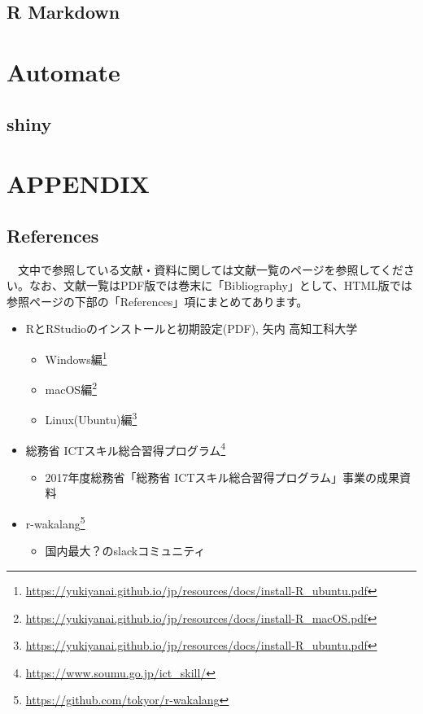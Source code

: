 \documentclass[
  12pt,
]{book}
\DeclareRobustCommand{\href}[2]{#2\footnote{\url{#1}}}
\providecommand{\tightlist}{%
  \setlength{\itemsep}{0pt}\setlength{\parskip}{0pt}}
\begin{document}
\hypertarget{r-markdown}{%
\chapter{R Markdown}\label{r-markdown}}

\hypertarget{part-automate}{%
\part{Automate}\label{part-automate}}

\hypertarget{shiny}{%
\chapter{shiny}\label{shiny}}

\hypertarget{part-appendix}{%
\part{APPENDIX}\label{part-appendix}}

\hypertarget{appendix-appendix}{%
\appendix {}}


\hypertarget{references}{%
\chapter{References}\label{references}}

　文中で参照している文献・資料に関しては文献一覧のページを参照してください。なお、文献一覧はPDF版では巻末に「Bibliography」として、HTML版では参照ページの下部の「References」項にまとめてあります。

\begin{itemize}
\tightlist
\item
  RとRStudioのインストールと初期設定(PDF), 矢内 高知工科大学

  \begin{itemize}
  \tightlist
  \item
    \href{https://yukiyanai.github.io/jp/resources/docs/install-R_ubuntu.pdf}{Windows編}
  \item
    \href{https://yukiyanai.github.io/jp/resources/docs/install-R_macOS.pdf}{macOS編}
  \item
    \href{https://yukiyanai.github.io/jp/resources/docs/install-R_ubuntu.pdf}{Linux(Ubuntu)編}
  \end{itemize}
\item
  \href{https://www.soumu.go.jp/ict_skill/}{総務省 ICTスキル総合習得プログラム}

  \begin{itemize}
  \tightlist
  \item
    2017年度総務省「総務省 ICTスキル総合習得プログラム」事業の成果資料
  \end{itemize}
\item
  \href{https://github.com/tokyor/r-wakalang}{r-wakalang}

  \begin{itemize}
  \tightlist
  \item
    国内最大？のslackコミュニティ
  \end{itemize}
\end{itemize}
\end{document}
